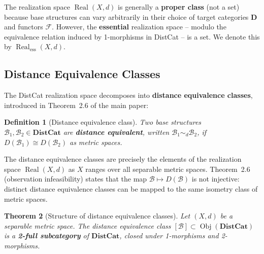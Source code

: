 \documentclass[11pt,a4paper]{article}
\newtheorem{theorem}{Theorem}[section]
\newtheorem{definition}[theorem]{Definition}
\begin{document}
\begin{remark}
The realization space $\operatorname{Real}(X,d)$ is generally a
\textbf{proper class} (not a set) because base structures can vary
arbitrarily in their choice of target categories $\mathbf{D}$ and functors
$\mathcal{F}$. However, the \textbf{essential} realization space -- modulo
the equivalence relation induced by 1-morphisms in DistCat -- is a set.
We denote this by $\operatorname{Real}_\mathrm{ess}(X,d)$.
\end{remark}

\subsection{Distance Equivalence Classes}

The DistCat realization space decomposes into \textbf{distance equivalence
classes}, introduced in Theorem~2.6 of the main paper:

\begin{definition}[Distance equivalence class]
Two base structures $\mathcal{B}_1,\mathcal{B}_2\in\mathbf{DistCat}$ are
\textbf{distance equivalent}, written $\mathcal{B}_1\sim_d\mathcal{B}_2$, if
$D(\mathcal{B}_1)\cong D(\mathcal{B}_2)$ as metric spaces.
\end{definition}

The distance equivalence classes are precisely the elements of the realization
space $\operatorname{Real}(X,d)$ as $X$ ranges over all separable metric spaces.
Theorem~2.6 (observation infeasibility) states that the map
$\mathcal{B}\mapsto D(\mathcal{B})$ is not injective: distinct distance
equivalence classes can be mapped to the same isometry class of metric spaces.

\begin{theorem}[Structure of distance equivalence classes]\label{thm:equivalence-structure}
Let $(X,d)$ be a separable metric space. The distance equivalence class
$[\mathcal{B}]\subset\operatorname{Obj}(\mathbf{DistCat})$ is a \textbf{2-full
subcategory} of $\mathbf{DistCat}$, closed under 1-morphisms and 2-morphisms.
\end{theorem}
\end{document}
